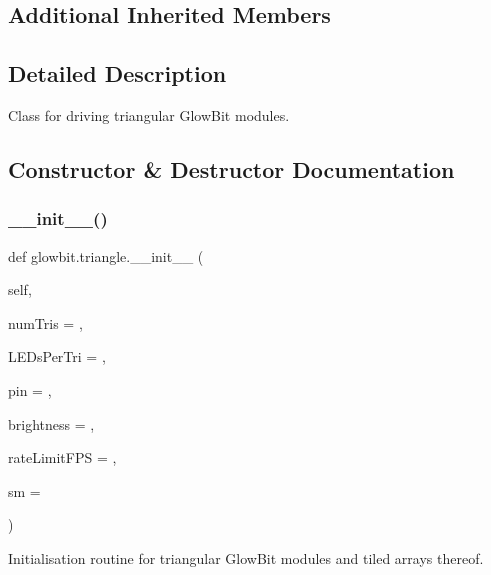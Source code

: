 \subsection*{Additional Inherited Members}


\subsection{Detailed Description}
Class for driving triangular Glow\+Bit modules. 

\subsection{Constructor \& Destructor Documentation}
\mbox{\label{classglowbit_1_1triangle_aa9ff905dd6cde53bf8a39b3f8cb9482f}} 
\subsubsection{\texorpdfstring{\+\_\+\+\_\+init\+\_\+\+\_\+()}{\_\_init\_\_()}}
{\footnotesize\ttfamily def glowbit.\+triangle.\+\_\+\+\_\+init\+\_\+\+\_\+ (\begin{DoxyParamCaption}\item[{}]{self,  }\item[{}]{num\+Tris = {},  }\item[{}]{L\+E\+Ds\+Per\+Tri = {},  }\item[{}]{pin = {},  }\item[{}]{brightness = {},  }\item[{}]{rate\+Limit\+F\+PS = {},  }\item[{}]{sm = {} }\end{DoxyParamCaption})}



Initialisation routine for triangular Glow\+Bit modules and tiled arrays thereof. 


